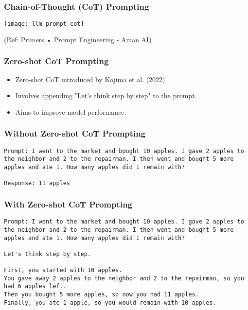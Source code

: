 \begin{frame}[fragile]\frametitle{Chain-of-Thought (CoT) Prompting}


\begin{center}
\texttt{[image: llm\_prompt\_cot]}

{\tiny (Ref: Primers • Prompt Engineering - Aman AI)}

\end{center}				
			

\end{frame}

\begin{frame}[fragile]\frametitle{Zero-shot CoT Prompting}



    \begin{itemize}
      \item Zero-shot CoT introduced by Kojima et al. (2022).
      \item Involves appending "Let's think step by step" to the prompt.
      \item Aims to improve model performance.
    \end{itemize}

\end{frame}

\begin{frame}[fragile]\frametitle{Without Zero-shot CoT Prompting}

\begin{lstlisting}
Prompt: I went to the market and bought 10 apples. I gave 2 apples to the neighbor and 2 to the repairman. I then went and bought 5 more apples and ate 1. How many apples did I remain with?

Response: 11 apples
\end{lstlisting}


\end{frame}


\begin{frame}[fragile]\frametitle{With Zero-shot CoT Prompting}


\begin{lstlisting}
Prompt: I went to the market and bought 10 apples. I gave 2 apples to the neighbor and 2 to the repairman. I then went and bought 5 more apples and ate 1. How many apples did I remain with?

Let's think step by step.

First, you started with 10 apples.
You gave away 2 apples to the neighbor and 2 to the repairman, so you had 6 apples left.
Then you bought 5 more apples, so now you had 11 apples.
Finally, you ate 1 apple, so you would remain with 10 apples.
\end{lstlisting}


\end{frame}


